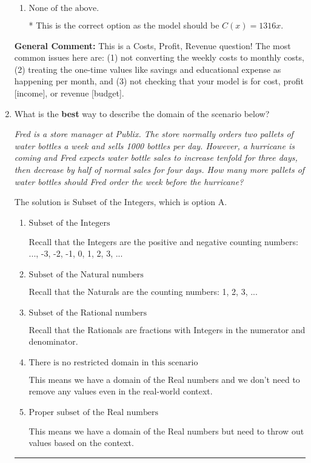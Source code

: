 \documentclass{extbook}[14pt]
\newcommand{\litem}[1]{\item #1

\rule{\textwidth}{0.4pt}}
\begin{document}
\begin{enumerate}
{\begin{enumerate}[label=\Alph*.]
This treats weekly expenses as monthly expenses rather than multiplying each weekly expense by 4.
\item \( \text{None of the above.} \)

* This is the correct option as the model should be $C(x) = 1316 x$.
\end{enumerate}

\textbf{General Comment:} This is a Costs, Profit, Revenue question! The most common issues here are: (1) not converting the weekly costs to monthly costs, (2) treating the one-time values like savings and educational expense as happening per month, and (3) not checking that your model is for cost, profit [income], or revenue [budget].
}
\litem{
What is the \textbf{best} way to describe the domain of the scenario below?

\begin{center}
    \textit{ Fred is a store manager at Publix. The store normally orders two pallets of water bottles a week and sells 1000 bottles per day. However, a hurricane is coming and Fred expects water bottle sales to increase tenfold for three days, then decrease by half of normal sales for four days. How many more pallets of water bottles should Fred order the week before the hurricane? }
\end{center}
The solution is \( \text{Subset of the Integers} \), which is option A.\begin{enumerate}[label=\Alph*.]
\item \( \text{Subset of the Integers} \)

Recall that the Integers are the positive and negative counting numbers: ..., -3, -2, -1, 0, 1, 2, 3, ... 
\item \( \text{Subset of the Natural numbers} \)

Recall that the Naturals are the counting numbers: 1, 2, 3, ...
\item \( \text{Subset of the Rational numbers} \)

Recall that the Rationals are fractions with Integers in the numerator and denominator.
\item \( \text{There is no restricted domain in this scenario} \)

This means we have a domain of the Real numbers and we don't need to remove any values even in the real-world context.
\item \( \text{Proper subset of the Real numbers} \)

This means we have a domain of the Real numbers but need to throw out values based on the context.
\end{enumerate}

}
\end{enumerate}
\end{document}
